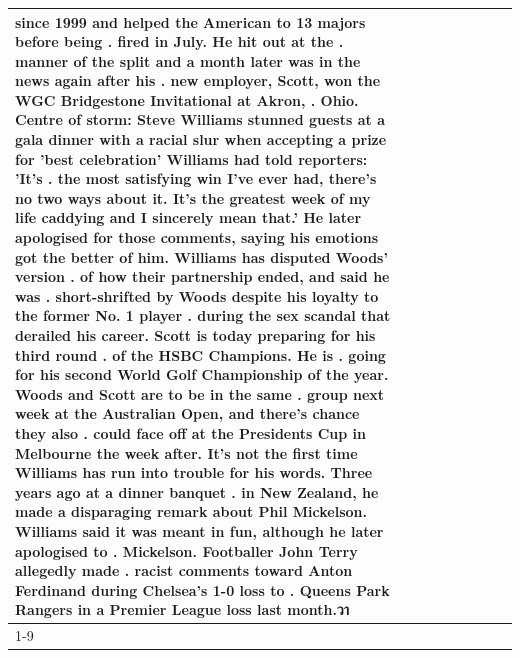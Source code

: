 \begin{table}[H]
\begin{tabular}{lllrlllll}
since 1999 and helped the American to 13 majors before being . fired in July. He hit out at the . manner of the split and a month later was in the news again after his . new employer, Scott, won the WGC Bridgestone Invitational at Akron, . Ohio. Centre of storm: Steve Williams stunned guests at a gala dinner with a racial slur when accepting a prize for 'best celebration' Williams had told reporters: 'It's . the most satisfying win I've ever had, there's no two ways about it. It's the greatest week of my life caddying and I sincerely mean that.' He later apologised for those comments, saying his emotions got the better of him. Williams has disputed Woods' version . of how their partnership ended, and said he was . short-shrifted by Woods despite his loyalty to the former No. 1 player . during the sex scandal that derailed his career. Scott is today preparing for his third round . of the HSBC Champions. He is . going for his second World Golf Championship of the year. Woods and Scott are to be in the same . group next week at the Australian Open, and there's chance they also . could face off at the Presidents Cup in Melbourne the week after. It's not the first time Williams has run into trouble for his words. Three years ago at a dinner banquet . in New Zealand, he made a disparaging remark about Phil Mickelson. Williams said it was meant in fun, although he later apologised to . Mickelson. Footballer John Terry allegedly made . racist comments toward Anton Ferdinand during Chelsea's 1-0 loss to . Queens Park Rangers in a Premier League loss last month.วา \\
\cline{1-9}

\end{tabular}
\end{table}
